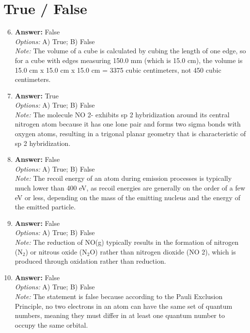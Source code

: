 \documentclass[12pt]{article}
\begin{document}
\section*{True / False}
\begin{enumerate}[label=\arabic*.]
\setcounter{enumi}{5}
\item \textbf{Answer:} False
\\ \textit{Options:} A) True; B) False
\\ \textit{Note:} The volume of a cube is calculated by cubing the length of one edge, so for a cube with edges measuring 150.0 mm (which is 15.0 cm), the volume is 15.0 cm x 15.0 cm x 15.0 cm = 3375 cubic centimeters, not 450 cubic centimeters.
\item \textbf{Answer:} True
\\ \textit{Options:} A) True; B) False
\\ \textit{Note:} The molecule NO 2- exhibits sp 2 hybridization around its central nitrogen atom because it has one lone pair and forms two sigma bonds with oxygen atoms, resulting in a trigonal planar geometry that is characteristic of sp 2 hybridization.
\item \textbf{Answer:} False
\\ \textit{Options:} A) True; B) False
\\ \textit{Note:} The recoil energy of an atom during emission processes is typically much lower than 400 eV, as recoil energies are generally on the order of a few eV or less, depending on the mass of the emitting nucleus and the energy of the emitted particle.
\item \textbf{Answer:} False
\\ \textit{Options:} A) True; B) False
\\ \textit{Note:} The reduction of NO(g) typically results in the formation of nitrogen (N$_{2}$) or nitrous oxide (N$_{2}$O) rather than nitrogen dioxide (NO 2), which is produced through oxidation rather than reduction.
\item \textbf{Answer:} False
\\ \textit{Options:} A) True; B) False
\\ \textit{Note:} The statement is false because according to the Pauli Exclusion Principle, no two electrons in an atom can have the same set of quantum numbers, meaning they must differ in at least one quantum number to occupy the same orbital.
\end{enumerate}
\end{document}
